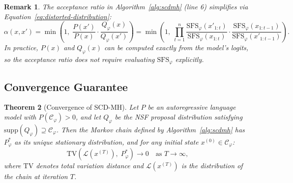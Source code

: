 \documentclass[twoside,11pt]{article}
\newtheorem{theorem}{Theorem}[section]
\newtheorem{remark}[theorem]{Remark}
\newcommand{\Constraint}{\mathcal{C}}
\newcommand{\TV}{\mathrm{TV}}
\newcommand{\support}{\mathrm{supp}}
\newcommand{\SFS}{\mathrm{SFS}}
\begin{document}
\begin{remark}
\label{rem:acceptance-ratio}
The acceptance ratio in Algorithm~\ref{alg:scdmh} (line 6) simplifies via
Equation~\ref{eq:distorted-distribution}:
\begin{equation}
\label{eq:mh-acceptance}
\alpha(x, x') = \min\!\left(1,\;
\frac{P(x')}{P(x)} \cdot \frac{Q_\varphi(x)}{Q_\varphi(x')}\right)
= \min\!\left(1,\; \prod_{t=1}^{n}
\frac{\SFS_\varphi(x'_{1:t})}{\SFS_\varphi(x_{1:t})} \cdot
\frac{\SFS_\varphi(x_{1:t-1})}{\SFS_\varphi(x'_{1:t-1})}\right).
\end{equation}
In practice, $P(x)$ and $Q_\varphi(x)$ can be computed exactly from the
model's logits, so the acceptance ratio does not require evaluating
$\SFS_\varphi$ explicitly.
\end{remark}

\subsection{Convergence Guarantee}
\label{sec:convergence}

\begin{theorem}[Convergence of SCD-MH]
\label{thm:convergence}
Let $P$ be an autoregressive language model with $P(\Constraint_\varphi)
> 0$, and let $Q_\varphi$ be the NSF proposal distribution satisfying
$\support(Q_\varphi) \supseteq \Constraint_\varphi$. Then the Markov chain
defined by Algorithm~\ref{alg:scdmh} has $P^*_\varphi$ as its unique
stationary distribution, and for any initial state $x^{(0)} \in
\Constraint_\varphi$:
\begin{equation}
\label{eq:convergence}
\TV\!\left(\mathcal{L}(x^{(T)}),\; P^*_\varphi\right) \to 0
\quad \text{as } T \to \infty,
\end{equation}
where $\TV$ denotes total variation distance and $\mathcal{L}(x^{(T)})$
is the distribution of the chain at iteration $T$.
\end{theorem}
\end{document}
